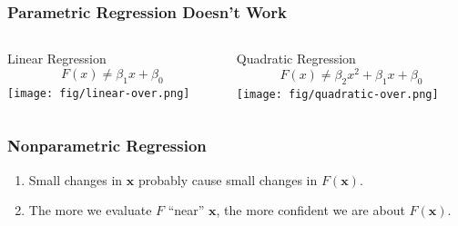 \documentclass{beamer}
\begin{document}
\begin{frame}
    \frametitle{Parametric Regression Doesn't Work}
    \begin{columns}
        \begin{column}{0.5\textwidth}
            \begin{center}
                Linear Regression
                \begin{equation*}
                    F(x) \neq  \beta_1 x + \beta_0
                \end{equation*}
                \texttt{[image: fig/linear-over.png]}
            \end{center}
        \end{column}
        \begin{column}{0.5\textwidth}
            \begin{center}
                Quadratic Regression
                \begin{equation*}
                    F(x) \neq \beta_2 x^2 + \beta_1 x + \beta_0
                \end{equation*}
                \texttt{[image: fig/quadratic-over.png]}
            \end{center}
        \end{column}
    \end{columns}
\end{frame}

\begin{frame}
    \frametitle{Nonparametric Regression}
    \begin{enumerate}
        \item Small changes in $\mathbf{x}$ probably cause small changes in $F(\mathbf{x})$.
            \pause
        \item The more we evaluate $F$ ``near'' $\mathbf{x}$, the more confident we are about $F(\mathbf{x})$.
    \end{enumerate}
\end{frame}
\end{document}
